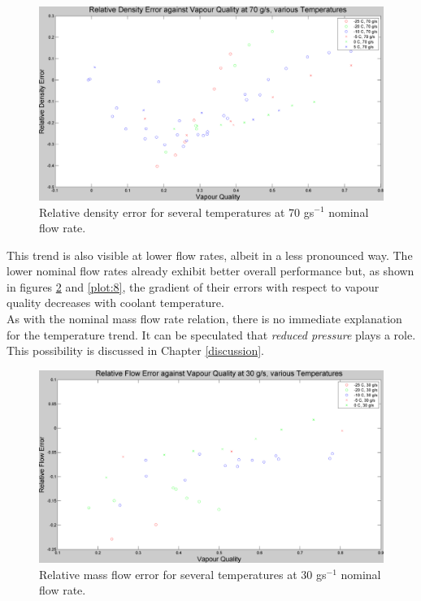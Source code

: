 \documentclass{report}
\begin{document}
\begin{figure}
\includegraphics[width=\textwidth]{plots/fig6}
\caption{Relative density error for several temperatures at 70 gs$^{-1}$ nominal flow rate.}
\label{plot:6}
\end{figure}
\FloatBarrier
This trend is also visible at lower flow rates, albeit in a less pronounced way. The lower nominal flow rates already exhibit better overall performance  but, as shown in figures \ref{plot:7} and \ref{plot:8}, the gradient of their errors with respect to vapour quality decreases with coolant temperature.\\
As with the nominal mass flow rate relation, there is no immediate explanation for the temperature trend. It can be speculated that \textit{reduced pressure} plays a role. This possibility is discussed in Chapter \ref{discussion}. \FloatBarrier
\begin{figure}
\includegraphics[width=\textwidth]{plots/fig7}
\caption{Relative mass flow error for several temperatures at 30 gs$^{-1}$ nominal flow rate.}
\label{plot:7}
\end{figure}
\end{document}
